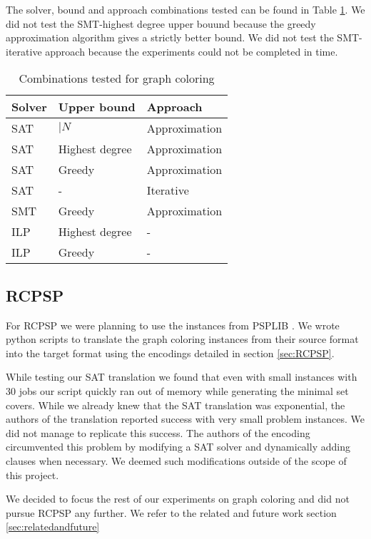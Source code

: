 \documentclass{sig-alternate}
\begin{document}
The solver, bound and approach combinations tested can be found in Table \ref{table:gccombinations}.
We did not test the SMT-highest degree upper bouund because the greedy approximation algorithm gives a strictly better bound.
We did not test the SMT-iterative approach because the experiments could not be completed in time.

\begin{table}
\begin{tabular}{ |l|l|l| }
\hline
Solver & Upper bound & Approach \\
\hline
SAT & $|N$ & Approximation \\
\hline
SAT & Highest degree & Approximation \\
\hline
SAT & Greedy & Approximation \\
\hline
SAT & - & Iterative \\
\hline
SMT & Greedy & Approximation \\
\hline
ILP & Highest degree & - \\
\hline
ILP & Greedy & - \\
\hline
\end{tabular}
\caption{Combinations tested for graph coloring}
\label{table:gccombinations}
\end{table}

\subsection{RCPSP}

For RCPSP we were planning to use the instances from PSPLIB \cite{kolisch1997psplib}.
We wrote python scripts to translate the graph coloring instances from their source format into the target format using the encodings detailed in section \ref{sec:RCPSP}.

While testing our SAT translation we found that even with small instances with 30 jobs our script quickly ran out of memory while generating the minimal set covers.
While we already knew that the SAT translation was exponential, the authors of the translation reported success with very small problem instances. We did not manage to replicate this success.
The authors of the encoding circumvented this problem by modifying a SAT solver and dynamically adding clauses when necessary.
We deemed such modifications outside of the scope of this project.

We decided to focus the rest of our experiments on graph coloring and did not pursue RCPSP any further.
We refer to the related and future work section \ref{sec:relatedandfuture}
\end{document}
